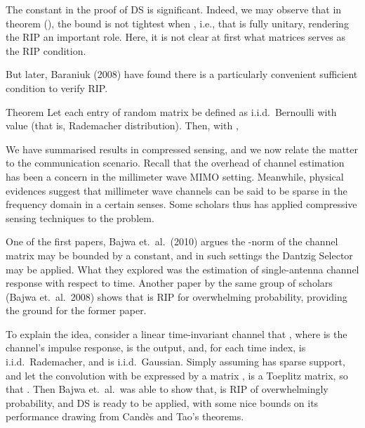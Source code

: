 \stopsection
\startsection [title={Sufficient Conditions of RIP}]

The constant \m {\d} in the proof of DS is significant.
Indeed, we may observe that in theorem (), the bound is not tightest when , i.e., that  is fully unitary, rendering the RIP an important role.
Here, it is not clear at first what matrices serves as the RIP condition.

But later, Baraniuk (2008) have found there is a particularly convenient sufficient condition to verify RIP.

\Result
{Theorem}
{
Let each entry of random matrix  be defined as i.i.d.\ Bernoulli with value  (that is, Rademacher distribution).
Then, with ,
%
}

\color[red] {(To be done)}

\stopsection
\startsection [title={Compressed Channel Sensing}]

We have summarised results in compressed sensing, and we now relate the matter to the communication scenario.
Recall that the overhead of channel estimation has been a concern in the millimeter wave MIMO setting.
Meanwhile, physical evidences suggest that millimeter wave channels can be said to be sparse in the frequency domain in a certain senses.
Some scholars thus has applied compressive sensing techniques to the problem.

One of the first papers, Bajwa et.\ al.\ (2010) argues the -norm of the channel matrix may be bounded by a constant, and in such settings the Dantzig Selector may be applied.
What they explored was the estimation of single-antenna channel response with respect to time.
Another paper by the same group of scholars (Bajwa et.\ al.\ 2008) shows that  is RIP for overwhelming probability, providing the ground for the former paper.

To explain the idea, consider a linear time-invariant channel that , where  is the channel's impulse response,  is the output, and, for each time index,  is i.i.d.\ Rademacher, and  is i.i.d.\ Gaussian.
Simply assuming  has sparse support, and let the convolution with  be expressed by a matrix ,  is a Toeplitz matrix, so that .
Then Bajwa et.\ al.\ was able to show that,  is RIP of overwhelmingly probability, and DS is ready to be applied, with some nice bounds on its performance drawing from Cand\`es and Tao's theorems.

